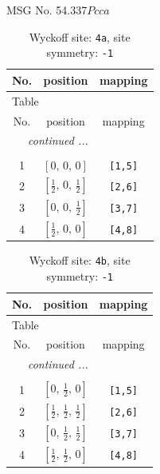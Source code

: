 \documentclass[fleqn,8pt]{jsarticle}
\begin{document}
\setcounter{MaxMatrixCols}{32}

\renewcommand{\tablename}{Table~}
\renewcommand{\figurename}{Figure~}
\begin{center}
\LARGE
MSG No. 54.337\quad$Pcca$
\end{center}
\renewcommand{\arraystretch}{1.2}
\begin{longtable}{ccc}
\caption{Wyckoff site: {\tt 4a}, site symmetry: {\tt -1}}
 \\
 \hline \hline
No. & position & mapping \\ \hline \endfirsthead

\multicolumn{2}{l}{\tablename\ \thetable{}} \\
 \hline \hline
No. & position & mapping \\ \hline \endhead

 \hline \hline
\multicolumn{2}{r}{\footnotesize\it continued ...} \\ \endfoot

 \hline \hline
\multicolumn{2}{r}{} \\ \endlastfoot

1 & $\left[ 0,\, 0,\, 0 \right]$ & {\tt [1,5]} \\ \hline
2 & $\left[ \frac{1}{2},\, 0,\, \frac{1}{2} \right]$ & {\tt [2,6]} \\ \hline
3 & $\left[ 0,\, 0,\, \frac{1}{2} \right]$ & {\tt [3,7]} \\ \hline
4 & $\left[ \frac{1}{2},\, 0,\, 0 \right]$ & {\tt [4,8]} \\
\end{longtable}
\renewcommand{\arraystretch}{1.2}
\begin{longtable}{ccc}
\caption{Wyckoff site: {\tt 4b}, site symmetry: {\tt -1}}
 \\
 \hline \hline
No. & position & mapping \\ \hline \endfirsthead

\multicolumn{2}{l}{\tablename\ \thetable{}} \\
 \hline \hline
No. & position & mapping \\ \hline \endhead

 \hline \hline
\multicolumn{2}{r}{\footnotesize\it continued ...} \\ \endfoot

 \hline \hline
\multicolumn{2}{r}{} \\ \endlastfoot

1 & $\left[ 0,\, \frac{1}{2},\, 0 \right]$ & {\tt [1,5]} \\ \hline
2 & $\left[ \frac{1}{2},\, \frac{1}{2},\, \frac{1}{2} \right]$ & {\tt [2,6]} \\ \hline
3 & $\left[ 0,\, \frac{1}{2},\, \frac{1}{2} \right]$ & {\tt [3,7]} \\ \hline
4 & $\left[ \frac{1}{2},\, \frac{1}{2},\, 0 \right]$ & {\tt [4,8]} \\
\end{longtable}
\end{document}
